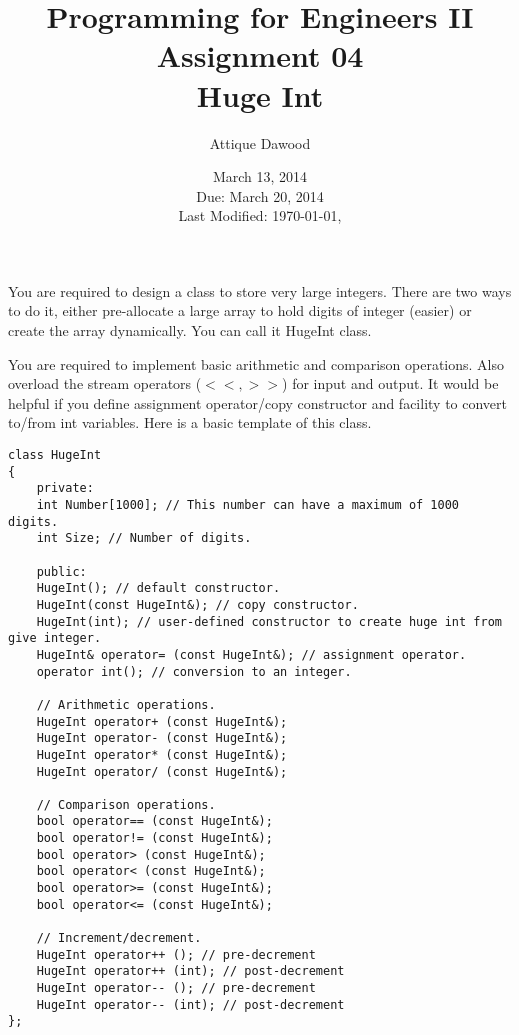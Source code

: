 \documentclass[12pt,a4paper]{article}
\title{\vspace{-2cm}Programming for Engineers II\\Assignment 04\\Huge Int}
\author{Attique Dawood}
\date{March 13, 2014\\Due: March 20, 2014\\[0.2cm] Last Modified: \today, \currenttime}
\begin{document}
\maketitle
You are required to design a class to store very large integers. There are two ways to do it, either pre-allocate a large array to hold digits of integer (easier) or create the array dynamically. You can call it HugeInt class.

You are required to implement basic arithmetic and comparison operations. Also overload the stream operators ($<<, >>$) for input and output. It would be helpful if you define assignment operator/copy constructor and facility to convert to/from int variables. Here is a basic template of this class.
\begin{lstlisting}
class HugeInt
{
    private:
    int Number[1000]; // This number can have a maximum of 1000 digits.
    int Size; // Number of digits.

    public:
    HugeInt(); // default constructor.
    HugeInt(const HugeInt&); // copy constructor.
    HugeInt(int); // user-defined constructor to create huge int from give integer.
    HugeInt& operator= (const HugeInt&); // assignment operator.
    operator int(); // conversion to an integer.

    // Arithmetic operations.
    HugeInt operator+ (const HugeInt&);
    HugeInt operator- (const HugeInt&);
    HugeInt operator* (const HugeInt&);
    HugeInt operator/ (const HugeInt&);

    // Comparison operations.
    bool operator== (const HugeInt&);
    bool operator!= (const HugeInt&);
    bool operator> (const HugeInt&);
    bool operator< (const HugeInt&);
    bool operator>= (const HugeInt&);
    bool operator<= (const HugeInt&);

    // Increment/decrement.
    HugeInt operator++ (); // pre-decrement
    HugeInt operator++ (int); // post-decrement
    HugeInt operator-- (); // pre-decrement
    HugeInt operator-- (int); // post-decrement
};
\end{lstlisting}
\end{document}
